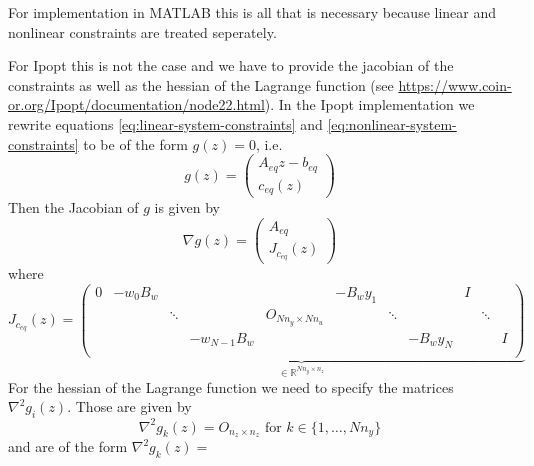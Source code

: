 \documentclass[
12pt, %
a4paper, %
onecolumn, %
portrait %
]{article}
\begin{document}
For implementation in MATLAB this is all that is necessary because linear and nonlinear constraints are treated seperately. 

For Ipopt this is not the case and we have to provide the jacobian of the constraints as well as the hessian of the Lagrange function (see \url{https://www.coin-or.org/Ipopt/documentation/node22.html}).
In the Ipopt implementation we rewrite equations \eqref{eq:linear-system-constraints} and \eqref{eq:nonlinear-system-constraints} to be of the form $g(z) = 0$, i.e.
\begin{equation}
g(z) = 
\begin{pmatrix}
A_{eq} z - b_{eq} \\
c_{eq}(z)
\end{pmatrix}
\end{equation}
Then the Jacobian of $g$ is given by
\begin{equation}
\nabla g (z) =
\begin{pmatrix}
A_{eq}\\
J_{c_{eq}}(z)
\end{pmatrix}
\end{equation}
where 
\begin{equation}
J_{c_{eq}}(z) = 
\underbrace{
\begin{pmatrix}
0 & -w_0 B_w &        &              &                        & -B_w y_1 &        &          & I &        &   \\
  &          & \ddots &              & O_{N n_y \times N n_u} &          & \ddots &          &   & \ddots &   \\
  &          &        & -w_{N-1} B_w &                        &          &        & -B_w y_N &   &        & I \\
\end{pmatrix}}_{
\in \mathbb{R}^{N n_y \times n_z}}
\end{equation}
For the hessian of the Lagrange function we need to specify the matrices $\nabla^2 g_i(z)$. Those are given by
\begin{equation}
\nabla^2 g_k(z) = O_{n_z \times n_z} \text{ for } k \in \{1, \hdots, N n_y\}
\end{equation}
and are of the form $\nabla^2 g_k(z) = $
\def\Bw{B_w(j,:)}
\def\Bwt{\Bw^T}
\end{document}
